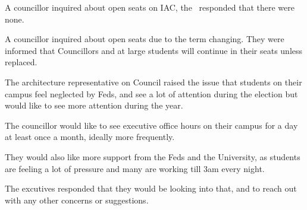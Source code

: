 \begin{information}

    A councillor inquired about open seats on IAC, the \vpi\ responded that
    there were none. 

\end{information}

\begin{information}

    A councillor inquired about open seats due to the term changing. 
    They were informed that Councillors and at large students will continue in
    their seats unless replaced. 

\end{information}

\begin{information}

    The architecture representative on Council raised the issue that 
    students on their campus feel neglected by Feds, and see a lot of 
    attention during the election but would like to see more attention 
    during the year. 

    The councillor would like to see executive office hours on their campus for
    a day at least once a month, ideally more frequently. 

    They would also like more support from the Feds and the University, as
    students are feeling a lot of pressure and many are working till 3am every
    night. 

    The excutives responded that they would be looking into that, and to
    reach out with any other concerns or suggestions.

\end{information}

